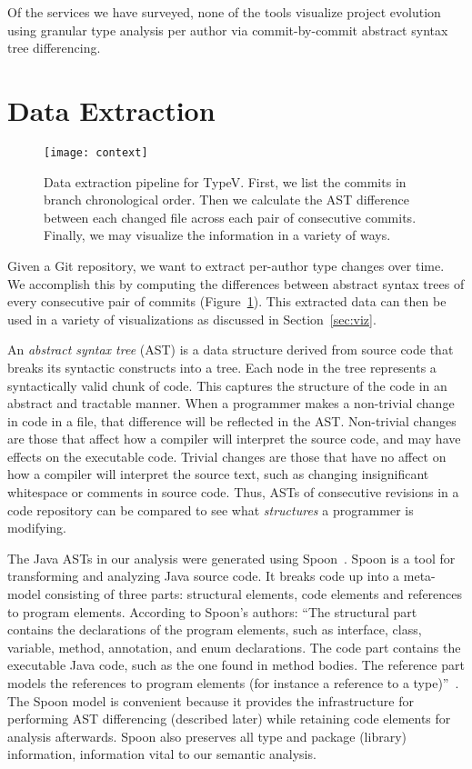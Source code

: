 Of the services we have surveyed, none of the tools visualize project evolution using granular type analysis per author via commit-by-commit abstract syntax tree differencing.

\section{Data Extraction}
\label{sec:methodology}

\begin{figure}[!h]
\centering
\texttt{[image: context]}
\caption{Data extraction pipeline for TypeV. First, we list the commits in branch chronological order. Then we calculate the AST difference between each changed file across each pair of consecutive commits. Finally, we may visualize the information in a variety of ways.}
\label{fig:context}
\end{figure}

Given a Git repository, we want to extract per-author type changes over time. We accomplish this by computing the differences between abstract syntax trees of every consecutive pair of commits (Figure~\ref{fig:context}). This extracted data can then be used in a variety of visualizations as discussed in Section~\ref{sec:viz}.

An \emph{abstract syntax tree} (AST) is a data structure derived from source code that breaks its syntactic constructs into a tree. Each node in the tree represents a syntactically valid chunk of code. This captures the structure of the code in an abstract and tractable manner. When a programmer makes a non-trivial change in code in a file, that difference will be reflected in the AST\@. Non-trivial changes are those that affect how a compiler will interpret the source code, and may have effects on the executable code. Trivial changes are those that have no affect on how a compiler will interpret the source text, such as changing insignificant whitespace or comments in source code. Thus, ASTs of consecutive revisions in a code repository can be compared to see what \emph{structures} a programmer is modifying.

The Java ASTs in our analysis were generated using Spoon~\cite{pawlak:hal-01169705}. Spoon is a tool for transforming and analyzing Java source code. It breaks code up into a meta-model consisting of three parts: structural elements, code elements and references to program elements. According to Spoon's authors: ``The structural part contains the declarations of the program elements, such as interface, class, variable, method, annotation, and enum declarations.  The code part contains the executable Java code, such as the one found in method bodies. The reference part models the references to program elements (for instance a reference to a type)''~\cite{pawlak:hal-01169705}. The Spoon model is convenient because it provides the infrastructure for performing AST differencing (described later) while retaining code elements for analysis afterwards. Spoon also preserves all type and package (library) information, information vital to our semantic analysis.

